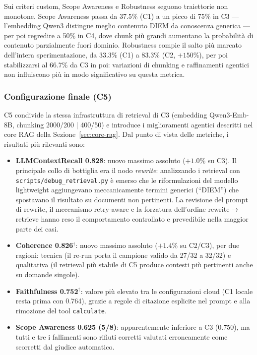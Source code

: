 \documentclass[11pt,a4paper]{article}
\newcommand{\code}[1]{\texttt{\small#1}}
\begin{document}
Sui criteri custom, Scope Awareness e Robustness seguono traiettorie non monotone. Scope
Awareness passa da 37.5\% (C1) a un picco di 75\% in C3 --- l'embedding Qwen3 distingue
meglio contenuto DIEM da conoscenza generica --- per poi regredire a 50\% in C4, dove
chunk più grandi aumentano la probabilità di contenuto parzialmente fuori dominio.
Robustness compie il salto più marcato dell'intera sperimentazione, da 33.3\% (C1) a
83.3\% (C2, $+150\%$), per poi stabilizzarsi al 66.7\% da C3 in poi: variazioni di
chunking e raffinamenti agentici non influiscono più in modo significativo su questa
metrica.

\subsubsection{Configurazione finale (C5)}

C5 condivide la stessa infrastruttura di retrieval di C3 (embedding Qwen3-Emb-8B,
chunking 2000/200 | 400/50) e introduce i miglioramenti agentici descritti nel
core RAG della Sezione~\ref{sec:core-rag}. Dal punto di vista delle metriche, i risultati
più rilevanti sono:
\begin{itemize}
  \item \textbf{LLMContextRecall 0.828}: nuovo massimo assoluto ($+1.0\%$ su C3). Il
    principale collo di bottiglia era il nodo \emph{rewrite}: analizzando i retrieval
    con \code{scripts/debug\_retrieval.py} è emerso che le riformulazioni del modello
    lightweight aggiungevano meccanicamente termini generici (``DIEM'') che spostavano
    il risultato su documenti non pertinenti. La revisione del prompt di rewrite, il
    meccanismo retry-aware e la forzatura dell'ordine rewrite$\to$retrieve hanno reso il
    comportamento controllato e prevedibile nella maggior parte dei casi.
  \item \textbf{Coherence 0.826$^\dagger$}: nuovo massimo assoluto ($+1.4\%$ su C2/C3),
    per due ragioni: tecnica (il re-run porta il campione valido da 27/32 a 32/32) e
    qualitativa (il retrieval più stabile di C5 produce contesti più pertinenti anche
    su domande singole).
  \item \textbf{Faithfulness 0.752$^\dagger$}: valore più elevato tra le configurazioni
    cloud (C1 locale resta prima con 0.764), grazie a regole di citazione esplicite nel
    prompt e alla rimozione del tool \code{calculate}.
  \item \textbf{Scope Awareness 0.625 (5/8)}: apparentemente inferiore a C3 (0.750), ma
    tutti e tre i fallimenti sono rifiuti corretti valutati erroneamente come scorretti
    dal giudice automatico.
\end{itemize}
\end{document}
